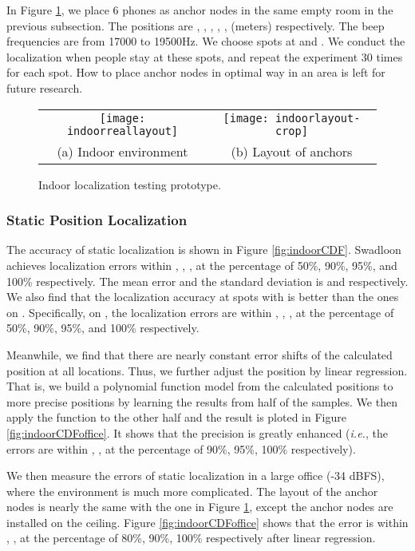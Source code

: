 \documentclass[]{sig-alternate-10pt}
\def\ie{\textit{i.e.}\xspace}
\def \ourprotocol{Swadloon\xspace}
\begin{document}
In Figure \ref{fig:indoorplacement}, we place 6 phones as anchor nodes
in the same empty room in the previous subsection. The positions are
, , , , , 
(meters) respectively.  The beep frequencies are from 17000 to
19500Hz. We choose spots at  and .
We conduct the  localization when people stay at these spots, and
repeat the experiment  30 times for each spot.
How to place anchor nodes in optimal way in an area is left for future
research.
\begin{figure}[htb]
\begin{center}
\begin{tabular}{cc}
\texttt{[image: indoorreallayout]}\quad &
\texttt{[image: indoorlayout-crop]}       \\
(a) Indoor environment & (b) Layout of anchors
\end{tabular}
\end{center}
\caption{Indoor localization testing prototype.}
\label{fig:indoorplacement}
\end{figure}



\subsubsection{Static Position Localization}
\label{subsubsec:localization}

The accuracy of  static  localization is shown in Figure
\ref{fig:indoorCDF}.
\ourprotocol achieves localization errors within ,
, ,  at the percentage of 50\%, 90\%, 95\%, and 100\%
respectively. The mean error and the standard deviation is  and
 respectively.
We also find that the localization accuracy at spots with 
 is better than the ones on .
Specifically, on ,
 the localization errors are within , , ,  at the
 percentage of 50\%, 90\%, 95\%, and 100\% respectively. 
 
Meanwhile, we find that there are nearly constant error shifts of the
 calculated position at all  locations. 
Thus, we further adjust the position by linear regression. 
That is, we build a polynomial function model from the calculated
 positions to more precise positions by learning the results from half 
 of the samples. 
We then apply the function to the other half and the result is ploted in Figure
\ref{fig:indoorCDFoffice}.
It shows that the 
 precision is greatly enhanced (\ie, the errors are within ,
 ,  at the 
 percentage of 90\%, 95\%, 100\% respectively). 
 
We then measure the errors of static localization
 in a large office (-34 dBFS), where the
 environment is much more complicated. 
The layout of the anchor nodes is nearly the same with the one in Figure
 \ref{fig:indoorplacement}, except the anchor nodes are installed on
 the ceiling. Figure \ref{fig:indoorCDFoffice} shows that the
 error is within , ,  at the percentage of 80\%,
 90\%, 100\% respectively after linear regression.
\end{document}
